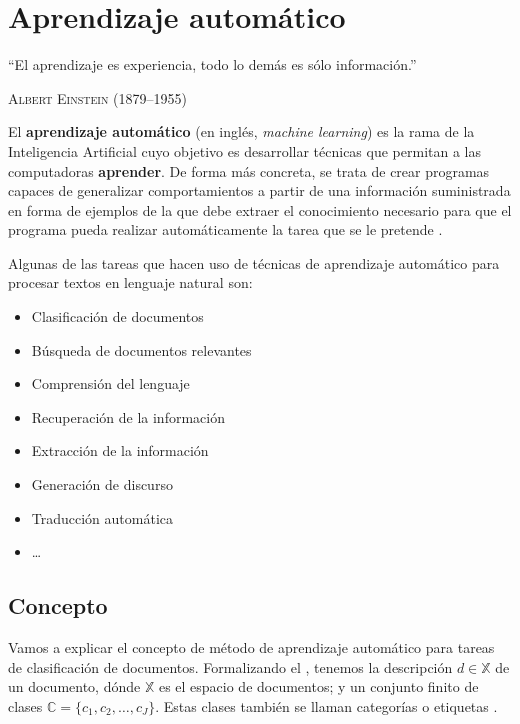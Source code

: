 
\chapter{Aprendizaje automático}

\epigraph{``El aprendizaje es experiencia, todo lo demás es sólo información.''}{\textsc{Albert Einstein} (1879--1955)}

El \textbf{aprendizaje automático} (en inglés, \emph{machine learning}) es la rama de la Inteligencia Artificial cuyo objetivo es desarrollar técnicas que permitan a las computadoras \textbf{aprender}. De forma más concreta, se trata de crear programas capaces de generalizar comportamientos a partir de una información suministrada en forma de ejemplos de la que debe extraer el conocimiento necesario para que el programa pueda realizar automáticamente la tarea que se le pretende \citep[Aprendizaje automático]{wikipedia-es}.

Algunas de las tareas que hacen uso de técnicas de aprendizaje automático \citep{MartinMateos2013} para procesar textos en lenguaje natural son: 
\begin{itemize}
\item Clasificación de documentos
\item Búsqueda de documentos relevantes
\item Comprensión del lenguaje
\item Recuperación de la información
\item Extracción de la información
\item Generación de discurso
\item Traducción automática
\item \ldots
\end{itemize}

\section{Concepto}

Vamos a explicar el concepto de método de aprendizaje automático para tareas de clasificación de documentos.
Formalizando el , tenemos la descripción $d\in \mathbb{X}$ de un documento, dónde $\mathbb{X}$ es el espacio de documentos; y un conjunto finito de clases $\mathbb{C} = \{c_1, c_2, \ldots, c_J\}$. Estas clases también se llaman categorías o etiquetas \citep{Manning2008}.

